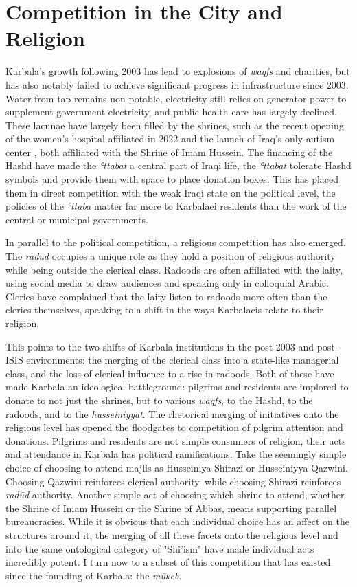 \section{Competition in the City and Religion}
Karbala's growth following 2003 has lead to explosions of \emph{waqfs} and charities, but has also notably failed to achieve significant progress in infrastructure since 2003. Water from tap remains non-potable, electricity still relies on generator power to supplement government electricity, and public health care has largely declined. These lacunae have largely been filled by the shrines, such as the recent opening of the women's hospital affiliated in 2022 and the launch of Iraq's only autism center \cite{imam_hussain_holy_shrine_imam_2020}, both affiliated with the Shrine of Imam Hussein. The financing of the Hashd have made the \emph{ʿttabat} a central part of Iraqi life, the \emph{ʿttabat}  tolerate Hashd symbols and provide them with space to place donation boxes. This has placed them in direct competition with the weak Iraqi state on the political level, the policies of the \emph{ʿttaba} matter far more to Karbalaei residents than the work of the central or municipal governments. 

In parallel to the political competition, a religious competition has also emerged. The \emph{radūd} occupies a unique role as they hold a position of religious authority while being outside the clerical class. Radoods are often affiliated with the laity, using social media to draw audiences and speaking only in colloquial Arabic. Clerics have complained that the laity listen to radoods more often than the clerics themselves, speaking to a shift in the ways Karbalaeis relate to their religion. 

This points to the two shifts of Karbala institutions in the post-2003 and post-ISIS environments: the merging of the clerical class into a state-like managerial class, and the loss of clerical influence to a rise in radoods. Both of these have made Karbala an ideological battleground: pilgrims and residents are implored to donate to not just the shrines, but to various \emph{waqfs}, to the Hashd, to the radoods, and to the \emph{husseiniyyat}. The rhetorical merging of initiatives onto the religious level has opened the floodgates to competition of pilgrim attention and donations. Pilgrims and residents are not simple consumers of religion, their acts and attendance in Karbala has political ramifications. Take the seemingly simple choice of choosing to attend majlis as Husseiniya Shirazi or Husseiniyya Qazwini. Choosing Qazwini reinforces clerical authority, while choosing Shirazi reinforces \emph{radūd} authority. Another simple act of choosing which shrine to attend, whether the Shrine of Imam Hussein or the Shrine of Abbas, means supporting parallel bureaucracies. While it is obvious that each individual choice has an affect on the structures around it, the merging of all these facets onto the religious level and into the same ontological category of "Shi'ism" have made individual acts incredibly potent. I turn now to a subset of this competition that has existed since the founding of Karbala: the \emph{mūkeb}.